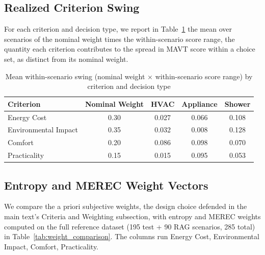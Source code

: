 \documentclass[11pt]{article}
\begin{document}
\subsection{Realized Criterion Swing}
\label{app:swing_weights}

For each criterion and decision type, we report in Table~\ref{tab:swing_weights} the mean over scenarios of the nominal weight times the within-scenario score range, the quantity each criterion contributes to the spread in MAVT score within a choice set, as distinct from its nominal weight.

\begin{table}[htbp]
\centering
\footnotesize
\centering
\caption{Mean within-scenario swing (nominal weight $\times$ within-scenario score range) by criterion and decision type}
\label{tab:swing_weights}
\renewcommand{\arraystretch}{1.15}
\begin{tabular}{lcccc}
\toprule
Criterion & Nominal Weight & HVAC & Appliance & Shower \\
\midrule
Energy Cost & 0.30 & 0.027 & 0.066 & 0.108 \\
Environmental Impact & 0.35 & 0.032 & 0.008 & 0.128 \\
Comfort & 0.20 & 0.086 & 0.098 & 0.070 \\
Practicality & 0.15 & 0.015 & 0.095 & 0.053 \\
\bottomrule
\end{tabular}
\renewcommand{\arraystretch}{1.0}
\end{table}

\subsection{Entropy and MEREC Weight Vectors}
\label{app:weights}

We compare the a priori subjective weights, the design choice defended in the main text's Criteria and Weighting subsection, with entropy and MEREC weights computed on the full reference dataset (195 test + 90 RAG scenarios, 285 total) in Table~\ref{tab:weight_comparison}. The columns run Energy Cost, Environmental Impact, Comfort, Practicality.
\end{document}
